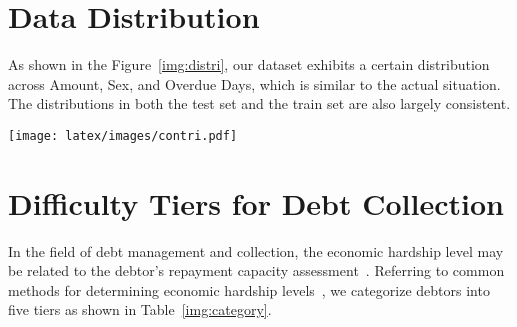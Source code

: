 \section{Data Distribution} \label{Distribution}

As shown in the Figure~\ref{img:distri}, our dataset exhibits a certain distribution across Amount, Sex, and Overdue Days, which is similar to the actual situation. The distributions in both the test set and the train set are also largely consistent.

\begin{figure*}[htbp]
  \centering
  \texttt{[image: latex/images/contri.pdf]}  
  \vspace{-0.2in}
  \caption{Distribution of Need collected Amount, Sex, and Overdue Days.}
\vspace{-0.0in}
\label{img:distri}
\end{figure*}

\section{Difficulty Tiers for Debt Collection} \label{app:diff_cat}

In the field of debt management and collection, the economic hardship level may be related to the debtor’s repayment capacity assessment~\citep{Zwilling2017EvaluatingYC}. Referring to common methods for determining economic hardship levels~\citep{elsevier2001international}, we categorize debtors into five tiers as shown in Table~\ref{img:category}.

\begin{table}[ht]
\centering
\vspace{-0.1in}
\caption{\label{img:category}Difficulty Tiers for Debt Collection}

\vspace{-0.1in}
\end{table}

